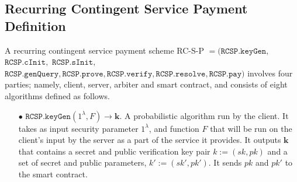 
\subsection{Recurring Contingent Service Payment Definition}\label{sec::RC-S-P-Definition}


\begin{definition}[RC-S-P Scheme]\label{RC-S-P-def}
A recurring contingent service payment scheme RC-S-P  $=(\mathtt{RCSP}.\mathtt{keyGen}, $ $\mathtt{RCSP}.\mathtt{cInit}, $ $\mathtt{RCSP}.\mathtt{sInit},  $ $\mathtt{RCSP}.\mathtt{genQuery},\mathtt{RCSP}.\mathtt{prove},\mathtt{RCSP}.\mathtt{verify},\mathtt{RCSP}.\mathtt{resolve},\mathtt{RCSP}.\mathtt{pay})$ involves four parties; namely, client, server, arbiter and smart contract, and consists of eight algorithms defined as follows.


\begin{itemize}

\item[$\bullet$] $\mathtt{RCSP}.\mathtt{keyGen}(1^{\scriptscriptstyle\lambda}, F)\rightarrow \bm{k}$.  A probabilistic algorithm run by the client. It takes as input security parameter $1^\lambda$, and  function $F$ that will be run on the client's input by the server as a part of the service it provides. It outputs $\bm{k}$ that contains a secret and public verification key pair $k:=(sk,pk)$ and a set of secret and public parameters, $k':=(sk',pk')$. It sends $pk$ and $pk'$ to the smart contract.

\



\end{itemize}
\end{definition}
